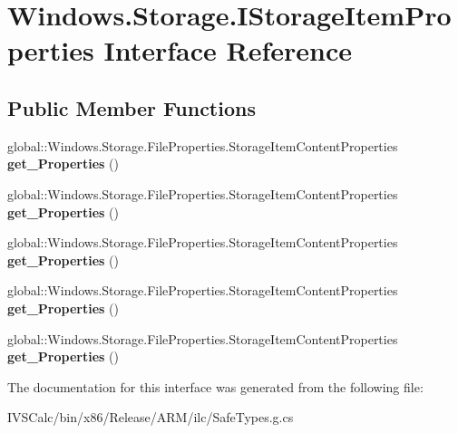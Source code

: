 \hypertarget{interface_windows_1_1_storage_1_1_i_storage_item_properties}{}\section{Windows.\+Storage.\+I\+Storage\+Item\+Properties Interface Reference}
\label{interface_windows_1_1_storage_1_1_i_storage_item_properties}
\subsection*{Public Member Functions}
\begin{DoxyCompactItemize}
\item 
\mbox{\label{interface_windows_1_1_storage_1_1_i_storage_item_properties_a7996bd12e6b7aa44db853e5293872f87}} 
global\+::\+Windows.\+Storage.\+File\+Properties.\+Storage\+Item\+Content\+Properties {\bfseries get\+\_\+\+Properties} ()
\item 
\mbox{\label{interface_windows_1_1_storage_1_1_i_storage_item_properties_a7996bd12e6b7aa44db853e5293872f87}} 
global\+::\+Windows.\+Storage.\+File\+Properties.\+Storage\+Item\+Content\+Properties {\bfseries get\+\_\+\+Properties} ()
\item 
\mbox{\label{interface_windows_1_1_storage_1_1_i_storage_item_properties_a7996bd12e6b7aa44db853e5293872f87}} 
global\+::\+Windows.\+Storage.\+File\+Properties.\+Storage\+Item\+Content\+Properties {\bfseries get\+\_\+\+Properties} ()
\item 
\mbox{\label{interface_windows_1_1_storage_1_1_i_storage_item_properties_a7996bd12e6b7aa44db853e5293872f87}} 
global\+::\+Windows.\+Storage.\+File\+Properties.\+Storage\+Item\+Content\+Properties {\bfseries get\+\_\+\+Properties} ()
\item 
\mbox{\label{interface_windows_1_1_storage_1_1_i_storage_item_properties_a7996bd12e6b7aa44db853e5293872f87}} 
global\+::\+Windows.\+Storage.\+File\+Properties.\+Storage\+Item\+Content\+Properties {\bfseries get\+\_\+\+Properties} ()
\end{DoxyCompactItemize}


The documentation for this interface was generated from the following file\+:\begin{DoxyCompactItemize}
\item 
I\+V\+S\+Calc/bin/x86/\+Release/\+A\+R\+M/ilc/Safe\+Types.\+g.\+cs\end{DoxyCompactItemize}
